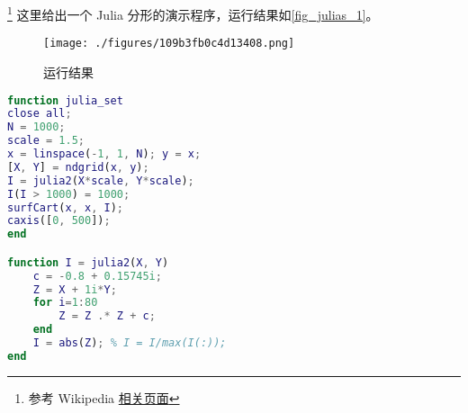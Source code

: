 
\begin{issues}
\issueDraft
\issueMissDepend
\end{issues}

\footnote{参考 Wikipedia \href{https://en.wikipedia.org/wiki/Julia_set}{相关页面}} 这里给出一个 Julia 分形的演示程序，运行结果如\autoref{fig_julias_1}。


\begin{figure}[ht]
\centering
\texttt{[image: ./figures/109b3fb0c4d13408.png]}
\caption{运行结果} \label{fig_julias_1}
\end{figure}

\begin{lstlisting}[language=matlab, caption=julia\_set.m]
function julia_set
close all;
N = 1000;
scale = 1.5;
x = linspace(-1, 1, N); y = x;
[X, Y] = ndgrid(x, y);
I = julia2(X*scale, Y*scale);
I(I > 1000) = 1000;
surfCart(x, x, I);
caxis([0, 500]);
end

function I = julia2(X, Y)
    c = -0.8 + 0.15745i;
    Z = X + 1i*Y;
    for i=1:80
        Z = Z .* Z + c;
    end
    I = abs(Z); % I = I/max(I(:));
end
\end{lstlisting}
